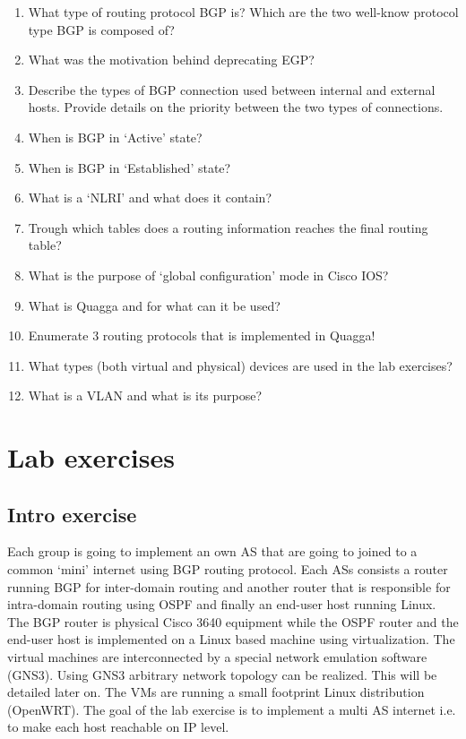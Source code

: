 \documentclass[a4paper]{article}
\begin{document}
\begin{enumerate}
    \item What type of routing protocol BGP is? Which are the two well-know protocol type BGP is composed of?
    \item What was the motivation behind deprecating EGP?
    \item Describe the types of BGP connection used between internal and external hosts. Provide details on the priority
          between the two types of connections.
    \item When is BGP in `Active' state?
    \item When is BGP in `Established' state?
    \item What is a `NLRI' and what does it contain?
    \item Trough which tables does a routing information reaches the final routing table?
    \item What is the purpose of `global configuration' mode in Cisco IOS?
    \item What is Quagga and for what can it be used?
    \item Enumerate 3 routing protocols that is implemented in Quagga!
    \item What types (both virtual and physical) devices are used in the lab exercises?
    \item What is a VLAN and what is its purpose?
\end{enumerate}

\section{Lab exercises}

\subsection{Intro exercise}

Each group is going to implement an own AS that are going to joined to a common `mini' internet using BGP routing
protocol.
Each ASs consists a router running BGP for inter-domain routing and another router that is responsible for intra-domain
routing using OSPF and finally an end-user host running Linux.
The BGP router is physical Cisco 3640 equipment while the OSPF router and the end-user host is implemented on a Linux
based machine using virtualization. The virtual machines are interconnected by a special network emulation software
(GNS3). Using GNS3 arbitrary network topology can be realized. This will be detailed later on. The VMs are running a
small footprint Linux distribution (OpenWRT). The goal of the lab exercise is to implement a multi AS internet i.e. to
make each host reachable on IP level.
\end{document}
